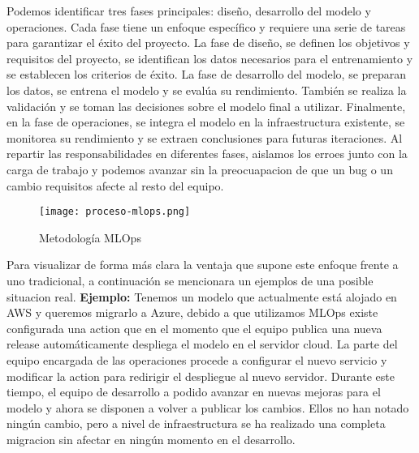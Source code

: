 Podemos identificar tres fases principales: diseño, desarrollo del modelo y operaciones. Cada fase tiene un enfoque
específico y requiere una serie de tareas para garantizar el éxito del proyecto. La fase de diseño,
se definen los objetivos y requisitos del proyecto, se identifican los datos necesarios para el entrenamiento y
se establecen los criterios de éxito. La fase de desarrollo del modelo, se preparan los datos, se entrena el modelo
y se evalúa su rendimiento. También se realiza la validación y se toman las decisiones sobre el modelo final a utilizar.
Finalmente, en la fase de operaciones, se integra el modelo en la infraestructura existente, se monitorea su rendimiento
y se extraen conclusiones para futuras iteraciones. Al repartir las responsabilidades en diferentes fases, aislamos los erroes junto con la carga de trabajo y podemos avanzar
sin la preocuapacion de que un bug o un cambio requisitos afecte al resto del equipo.

\begin{figure}[ht]
    \centering
    \texttt{[image: proceso-mlops.png]}
    \caption{Metodología MLOps}
    \label{fig:proces-mlops}
\end{figure}

Para visualizar de forma más clara la ventaja que supone este enfoque frente a uno tradicional, a continuación
se mencionara un ejemplos de una posible situacion real. \textbf{Ejemplo:} Tenemos un modelo que actualmente está alojado en AWS y queremos migrarlo a Azure, debido a que
utilizamos MLOps existe configurada una action que en el momento que el equipo publica una nueva release
automáticamente despliega el modelo en el servidor cloud. La parte del equipo encargada de las operaciones procede
a configurar el nuevo servicio y modificar la action para redirigir el despliegue al nuevo servidor. Durante este
tiempo, el equipo de desarrollo a podido avanzar en nuevas mejoras para el modelo y ahora se disponen a volver
a publicar los cambios. Ellos no han notado ningún cambio, pero a nivel de infraestructura se ha realizado una
completa migracion sin afectar en ningún momento en el desarrollo.


\pagebreak